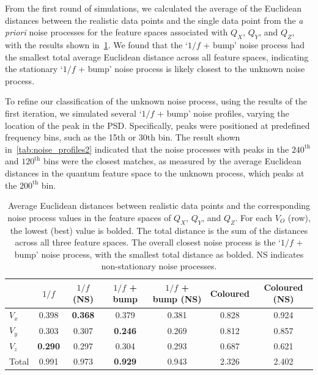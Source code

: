 \documentclass[12pt]{iopart}
\begin{document}
From the first round of simulations, we calculated the average of the Euclidean distances between the realistic data points and the single data point from the \textit{a priori} noise processes for the feature spaces associated with \(Q_X\), \(Q_Y\), and \(Q_Z\), with the results shown in~\cref{tab:noise_profiles}. We found that the `$1/f$ + bump' noise process had the smallest total average Euclidean distance across all feature spaces, indicating the stationary `$1/f$ + bump' noise process is likely closest to the unknown noise process.

To refine our classification of the unknown noise process, using the results of the first iteration, we simulated several `$1/f$ + bump' noise profiles, varying the location of the peak in the PSD. Specifically, peaks were positioned at predefined frequency bins, such as the 15th or 30th bin. The result shown in~\cref{tab:noise_profiles2} indicated that the noise processes with peaks in the $240^\mathrm{th}$ and $120^\mathrm{th}$ bins were the closest matches, as measured by the average Euclidean distances in the quantum feature space to the unknown process, which peaks at the $200^\mathrm{th}$ bin.

\begin{table}[ht]
    \centering
    \begin{tabular}{lcccccc}
        \toprule
              & $1/f$          & $1/f$ (NS)     & $1/f$ + bump   & $1/f$ + bump (NS) & Coloured & Coloured (NS) \\
        \midrule
        $V_x$ & 0.398          & \textbf{0.368} & 0.379          & 0.381             & 0.828    & 0.924         \\
        $V_y$ & 0.303          & 0.307          & \textbf{0.246} & 0.269             & 0.812    & 0.857         \\
        $V_z$ & \textbf{0.290} & 0.297          & 0.304          & 0.293             & 0.687    & 0.621         \\
        \midrule
        Total & 0.991          & 0.973          & \textbf{0.929} & 0.943             & 2.326    & 2.402         \\
        \bottomrule
    \end{tabular}
    \caption{Average Euclidean distances between realistic data points and the corresponding noise process values in the feature spaces of \(Q_X\), \(Q_Y\), and \(Q_Z\). For each \(V_O\) (row), the lowest (best) value is bolded. The total distance is the sum of the distances across all three feature spaces. The overall closest noise process is the `$1/f$ + bump' noise process, with the smallest total distance as bolded. NS indicates non-stationary noise processes.}
    \label{tab:noise_profiles}
\end{table}
\end{document}
